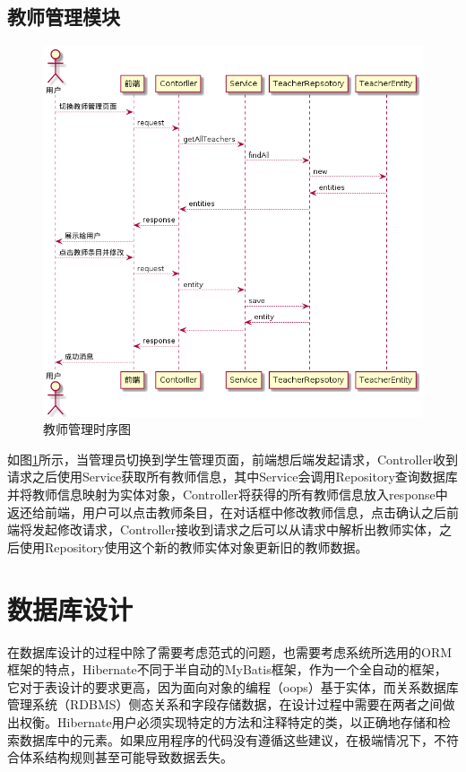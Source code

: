 \subsection{教师管理模块}

\begin{figure}
    \centering
    \includegraphics[scale = 0.6]{out/uml/时序图/manage-teacher-sequence/manage-teacher-sequence.png}
    \caption{\song\wuhao 教师管理时序图}
    \label{manage-teacher-sequence}
\end{figure}

如图\ref{manage-teacher-sequence}所示，当管理员切换到学生管理页面，前端想后端发起请求，Controller收到请求之后使用Service获取所有教师信息，其中Service会调用Repository查询数据库并将教师信息映射为实体对象，Controller将获得的所有教师信息放入response中返还给前端，用户可以点击教师条目，在对话框中修改教师信息，点击确认之后前端将发起修改请求，Controller接收到请求之后可以从请求中解析出教师实体，之后使用Repository使用这个新的教师实体对象更新旧的教师数据。

\section{数据库设计}

在数据库设计的过程中除了需要考虑范式的问题，也需要考虑系统所选用的ORM框架的特点，Hibernate不同于半自动的MyBatis框架，作为一个全自动的框架，它对于表设计的要求更高，因为面向对象的编程（oops）基于实体，而关系数据库管理系统（RDBMS）侧态关系和字段存储数据\cite{Dhingra2017ReviewOJ}，在设计过程中需要在两者之间做出权衡。Hibernate用户必须实现特定的方法和注释特定的类，以正确地存储和检索数据库中的元素。如果应用程序的代码没有遵循这些建议，在极端情况下，不符合体系结构规则甚至可能导致数据丢失\cite{10.1145/3350768.3351796}。

